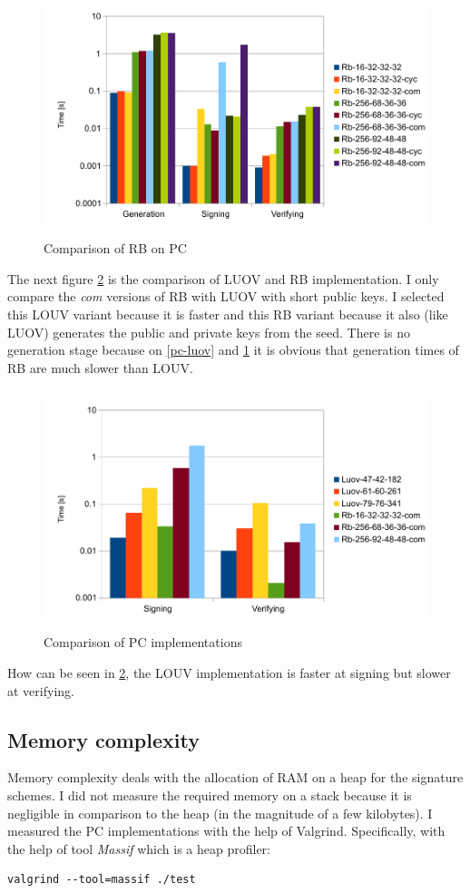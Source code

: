 \documentclass[thesis=M,english]{FITthesis}[2019/12/23]
\begin{document}
\begin{figure}[H]
\centering
\includegraphics[width=13cm,height=7cm]{images/pc-rb.pdf}
\caption{Comparison of RB on PC}
\label{pc-rb}
\end{figure}

\noindent
The next figure \ref{pc-all} is the comparison of LUOV and RB implementation. I only compare the \textit{com} versions of RB with LUOV with short public keys. I selected this LOUV variant because it is faster and this RB variant because it also (like LUOV) generates the public and private keys from the seed.
There is no generation stage because on \ref{pc-luov} and \ref{pc-rb} it is obvious that generation times of RB are much slower than LOUV. 

\begin{figure}[H]
\centering
\includegraphics[width=13cm,height=7cm]{images/pc-all.pdf}
\caption{Comparison of PC implementations}
\label{pc-all}
\end{figure}

\noindent
How can be seen in \ref{pc-all}, the LOUV implementation is faster at signing but slower at verifying.

\subsection{Memory complexity}\label{pc-mem-measurement}
Memory complexity deals with the allocation of RAM on a heap for the signature schemes. I did not measure the required memory on a stack because it is negligible in comparison to the heap (in the magnitude of a few kilobytes). I measured the PC implementations with the help of Valgrind. Specifically, with the help of tool \textit{Massif} which is a heap profiler:
\begin{lstlisting}[frame=single]
valgrind --tool=massif ./test
\end{lstlisting}
\end{document}
